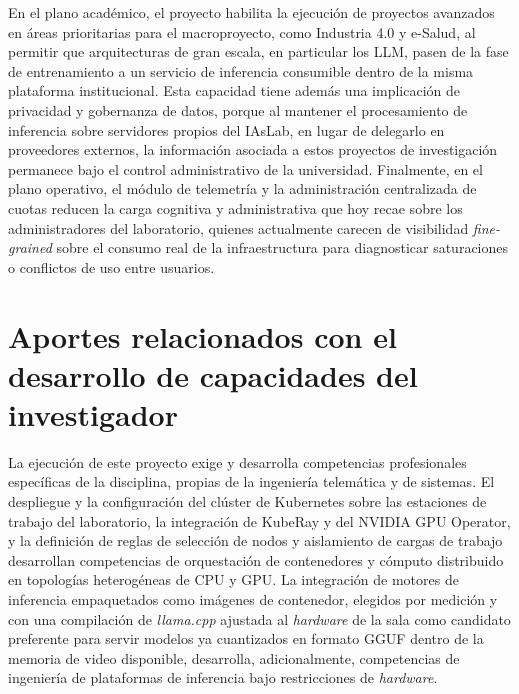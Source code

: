 En el plano académico, el proyecto habilita la ejecución de proyectos avanzados en áreas prioritarias para el macroproyecto, como Industria 4.0 y e-Salud, al permitir que arquitecturas de gran escala, en particular los LLM, pasen de la fase de entrenamiento a un servicio de inferencia consumible dentro de la misma plataforma institucional. Esta capacidad tiene además una implicación de privacidad y gobernanza de datos, porque al mantener el procesamiento de inferencia sobre servidores propios del IAsLab, en lugar de delegarlo en proveedores externos, la información asociada a estos proyectos de investigación permanece bajo el control administrativo de la universidad. Finalmente, en el plano operativo, el módulo de telemetría y la administración centralizada de cuotas reducen la carga cognitiva y administrativa que hoy recae sobre los administradores del laboratorio, quienes actualmente carecen de visibilidad \emph{fine-grained} sobre el consumo real de la infraestructura para diagnosticar saturaciones o conflictos de uso entre usuarios.

\section{Aportes relacionados con el desarrollo de capacidades del investigador}

La ejecución de este proyecto exige y desarrolla competencias profesionales específicas de la disciplina, propias de la ingeniería telemática y de sistemas. El despliegue y la configuración del clúster de Kubernetes sobre las estaciones de trabajo del laboratorio, la integración de KubeRay y del NVIDIA GPU Operator, y la definición de reglas de selección de nodos y aislamiento de cargas de trabajo desarrollan competencias de orquestación de contenedores y cómputo distribuido en topologías heterogéneas de CPU y GPU. La integración de motores de inferencia empaquetados como imágenes de contenedor, elegidos por medición y con una compilación de \emph{llama.cpp} ajustada al \emph{hardware} de la sala como candidato preferente para servir modelos ya cuantizados en formato GGUF dentro de la memoria de video disponible, desarrolla, adicionalmente, competencias de ingeniería de plataformas de inferencia bajo restricciones de \emph{hardware}.

